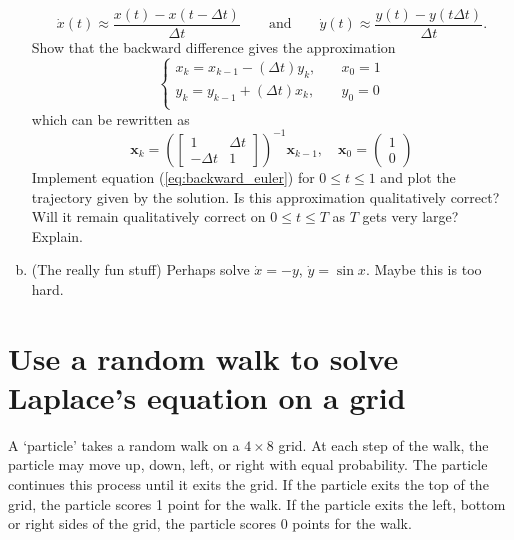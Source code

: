\documentclass[11pt,oneside]{article}
\theoremstyle{definition}
\theoremstyle{definition}
\theoremstyle{remark}
\numberwithin{equation}{section}
\begin{document}
\begin{enumerate}[(a)]
    \begin{equation} 
    \label{eq:backward_difference}
    \dot{x}(t) \approx \frac{x(t) - x(t - \Delta t)}{\Delta t} \qquad \text{and} \qquad \dot{y}(t) \approx \frac{y(t) - y(t  \Delta t)}{\Delta t}.
    \end{equation}
    Show that the backward difference gives the approximation
    \begin{equation}
    \label{eq:backward_euler}
     \begin{cases} x_{k} = x_{k-1} - (\Delta t) y_k, & \quad x_0 = 1\\  y_{k} = y_{k-1} + (\Delta t) x_k, & \quad y_0 = 0\\  \end{cases}
    \end{equation}
    which can be rewritten as
   \begin{equation*} 
    \bm{x}_{k} 
    = \left(\begin{bmatrix} 1 & \Delta t \\  -\Delta t & 1\end{bmatrix}\right)^{-1} \bm{x}_{k-1}, \quad \bm{x}_0 = \begin{pmatrix} 1\\0 \end{pmatrix}
    \end{equation*}
     Implement equation (\ref{eq:backward_euler}) for $0 \leq t \leq 1$ and plot the trajectory given by the solution. Is this approximation qualitatively correct? Will it remain qualitatively correct on $0 \leq t \leq T$ as $T$ gets very large? Explain.
    \item (The really fun stuff) Perhaps solve $\dot{x} = -y$, $\dot{y} = \sin x$.  Maybe this is too hard.
\end{enumerate}
\newpage

\section{Use a random walk to solve Laplace's equation on a grid } 
A `particle' takes a random walk on a $4 \times 8$ grid. At each step of the walk, the particle may move up, down, left, or right with equal probability. The particle continues this process until it exits the grid. If the particle exits the top of the grid, the particle scores 1 point for the walk. If the particle exits the left, bottom or right sides of the grid, the particle scores 0 points for the walk. 
\end{document}
